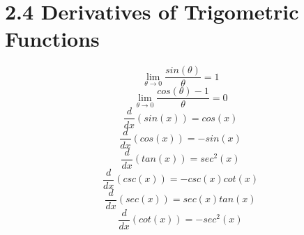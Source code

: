 %
%

\section*{2.4 Derivatives of Trigometric Functions}

\[ \lim_{\theta \to 0} \frac{sin(\theta)}{\theta}=1 \]
\[ \lim_{\theta \to 0} \frac{cos(\theta)-1}{\theta}=0 \]
\[ \frac{d}{dx}(sin(x))=cos(x) \]
\[ \frac{d}{dx}(cos(x))=-sin(x) \]
\[ \frac{d}{dx}(tan(x))=sec^2(x) \]
\[ \frac{d}{dx}(csc(x))=-csc(x)cot(x) \]
\[ \frac{d}{dx}(sec(x))=sec(x)tan(x) \]
\[ \frac{d}{dx}(cot(x))=-sec^2(x) \]
